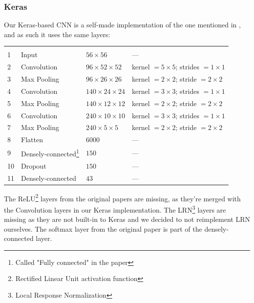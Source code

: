 \documentclass[conference]{IEEEtran}
\begin{document}
\subsubsection{Keras}
Our Keras-based CNN is a self-made implementation of the one mentioned in \cite{svm_paper}, and as such
it uses the same layers:
\begin{table}[H]
    \begin{tcolorbox}[arc=0pt,boxrule=0pt]
        \begin{tabularx}{\linewidth}{lllP{0.3\textwidth}}
            \toprule
            \thead{} &  &  &  \\
            \midrule\\
            1  & Input             & $56 \times 56$ & --- \\
            2  & Convolution       & $ 96 \times 52 \times 52$ & kernel $ = 5 \times 5 $; strides $ = 1 \times 1$\\
            3  & Max Pooling       & $ 96 \times 26 \times 26$ & kernel $ = 2 \times 2 $; stride $ = 2 \times 2 $\\
            4  & Convolution       & $140 \times 24 \times 24$ & kernel $ = 3 \times 3$; strides $ = 1 \times 1$ \\
            5  & Max Pooling       & $140 \times 12 \times 12$ & kernel $ = 2 \times 2 $; stride $ = 2 \times 2$ \\
            6  & Convolution       & $240 \times 10 \times 10$ & kernel $ = 3 \times 3$; strides $ = 1 \times 1$ \\
            7  & Max Pooling       & $240 \times  5 \times  5$ & kernel $ = 2 \times 2 $; stride $ = 2 \times 2$ \\
            8  & Flatten           & $6000$ & --- \\
            9  & Densely-connected\footnote{Called "Fully connected" in the paper} & $150$ & --- \\
            10 & Dropout           & $150$  & --- \\
            11 & Densely-connected & $43$   & --- \\
            \bottomrule
        \end{tabularx}
    \end{tcolorbox}
\end{table}

The ReLU\footnote{Rectified Linear Unit activation function} layers from the original papers are missing,
as they're merged with the Convolution layers in our Keras implementation. The LRN\footnote{Local Response Normalization}
layers are missing as they are not built-in to Keras and we decided to not reimplement LRN ourselves. The
softmax layer from the original paper is part of the densely-connected layer.
\end{document}
